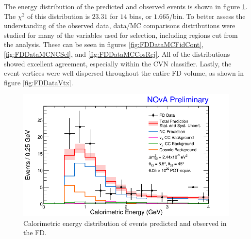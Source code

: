 The energy distribution of the predicted and observed events is shown in figure \ref{fig:FDDataMCECal}. The $\chi^2$ of this distribution is $23.31$ for $14$ bins, or $1.665$/bin. To better assess the understanding of the observed data, data/MC comparisons distributions were studied for many of the variables used for selection, including regions cut from the analysis. These can be seen in figures \ref{fig:FDDataMCFidCont}, \ref{fig:FDDataMCNCSel}, and \ref{fig:FDDataMCCosRej}. All of the distributions showed excellent agreement, especially within the CVN classifier. Lastly, the event vertices were well dispersed throughout the entire FD volume, as shown in figure \ref{fig:FDDataVtx}.
\begin{figure}[htbp]
  \centering
  \includegraphics[width=1\textwidth]{figures/FDDataMC/cCalEFDAllStSy.png}
  \caption[FD Data and MC Energy Distribution]{Calorimetric energy distribution of events predicted and observed in the FD.}
  \label{fig:FDDataMCECal}
\end{figure}

